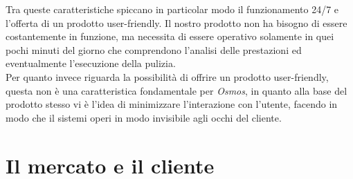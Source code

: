 \documentclass[a4paper, 12pt]{article}
\begin{document}
	Tra queste caratteristiche spiccano in particolar modo il funzionamento 24/7 e l'offerta di un prodotto user-friendly. Il nostro prodotto non ha bisogno di essere costantemente in funzione, ma necessita di essere operativo solamente in quei pochi minuti del giorno che comprendono l'analisi delle prestazioni ed eventualmente l'esecuzione della pulizia.\\
	Per quanto invece riguarda la possibilità di offrire un prodotto user-friendly, questa non è una caratteristica fondamentale per \emph{Osmos}, in quanto alla base del prodotto stesso vi è l'idea di minimizzare l'interazione con l'utente, facendo in modo che il sistemi operi in modo invisibile agli occhi del cliente.
	\section{Il mercato e il cliente}
\end{document}
